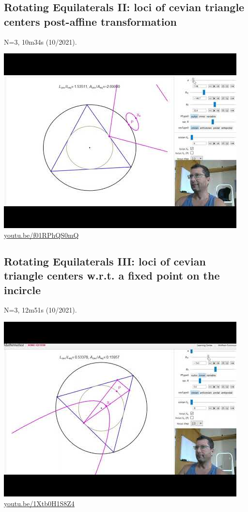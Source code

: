 \documentclass[12pt]{amsart}
\begin{document}
\subsection{Rotating Equilaterals II: loci of cevian triangle centers post-affine transformation}
\label{vid:f01RPhQS0mQ}
\noindent N=3, 10m34s (10/2021). 
\begin{center}\includegraphics[width=.5\textwidth]{pics/f01RPhQS0mQ.jpg} \\ 
\href{https://youtu.be/f01RPhQS0mQ}{\url{youtu.be/f01RPhQS0mQ}}\end{center}
% 

\subsection{Rotating Equilaterals III: loci of cevian triangle centers w.r.t. a fixed point on the incircle}
\label{vid:1Xtb0H1S8Z4}
\noindent N=3, 12m51s (10/2021). 
\begin{center}\includegraphics[width=.5\textwidth]{pics/1Xtb0H1S8Z4.jpg} \\ 
\href{https://youtu.be/1Xtb0H1S8Z4}{\url{youtu.be/1Xtb0H1S8Z4}}\end{center}
% 
\end{document}
